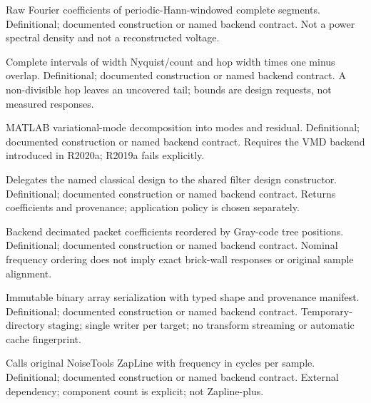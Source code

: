 {Raw Fourier coefficients of periodic-Hann-windowed complete segments.}
{Definitional; documented construction or named backend contract.}
{Not a power spectral density and not a reconstructed voltage.}

{Complete intervals of width Nyquist/count and hop width times one minus overlap.}
{Definitional; documented construction or named backend contract.}
{A non-divisible hop leaves an uncovered tail; bounds are design requests, not measured responses.}

{MATLAB variational-mode decomposition into modes and residual.}
{Definitional; documented construction or named backend contract.}
{Requires the VMD backend introduced in R2020a; R2019a fails explicitly.}

{Delegates the named classical design to the shared filter design constructor.}
{Definitional; documented construction or named backend contract.}
{Returns coefficients and provenance; application policy is chosen separately.}

{Backend decimated packet coefficients reordered by Gray-code tree positions.}
{Definitional; documented construction or named backend contract.}
{Nominal frequency ordering does not imply exact brick-wall responses or original sample alignment.}

{Immutable binary array serialization with typed shape and provenance manifest.}
{Definitional; documented construction or named backend contract.}
{Temporary-directory staging; single writer per target; no transform streaming or automatic cache fingerprint.}

{Calls original NoiseTools ZapLine with frequency in cycles per sample.}
{Definitional; documented construction or named backend contract.}
{External dependency; component count is explicit; not Zapline-plus.}
